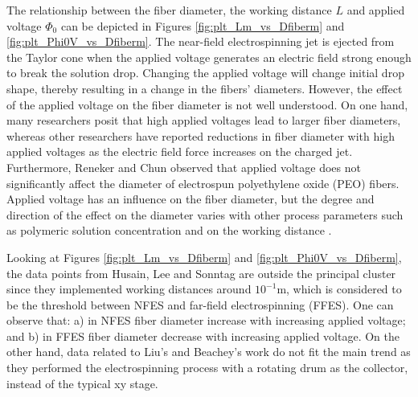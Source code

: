 The relationship between the fiber diameter, the working distance $L$ and applied voltage $\Phi_0$ can be depicted in Figures \ref{fig:plt_Lm_vs_Dfiberm} and \ref{fig:plt_Phi0V_vs_Dfiberm}. The near-field electrospinning jet is ejected from the Taylor cone when the applied voltage generates an electric field strong enough to break the solution drop. Changing the applied voltage will change initial drop shape, thereby resulting in a change in the fibers' diameters. However, the effect of the applied voltage on the fiber diameter is not well understood. On one hand, many researchers posit that high applied voltages lead to larger fiber diameters, whereas other researchers have reported reductions in fiber diameter with high applied voltages as the electric field force increases on the charged jet. \cite{Zhang2005} Furthermore, Reneker and Chun observed that applied voltage does not significantly affect the diameter of electrospun polyethylene oxide (PEO) fibers. \cite{Reneker1996} Applied voltage has an influence on the fiber diameter, but the degree and direction of the effect on the diameter varies with other process parameters such as polymeric solution concentration and on the working distance \cite{Yordem2008, Chang2016}.

Looking at Figures \ref{fig:plt_Lm_vs_Dfiberm} and \ref{fig:plt_Phi0V_vs_Dfiberm}, the data points from Husain, Lee and Sonntag \cite{Husain2016, Lee2012, Sonntag2020} are outside the principal cluster since they implemented working distances around $10^{-1} \textrm{m}$, which is considered to be the threshold between NFES and far-field electrospinning (FFES). One can observe that: a) in NFES fiber diameter increase with increasing applied voltage; and b) in FFES fiber diameter decrease with increasing applied voltage. On the other hand, data related to Liu's and Beachey's work \cite{Liu2014, Beachley2011} do not fit the main trend as they performed the electrospinning process with a rotating drum as the collector, instead of the typical xy stage. 


